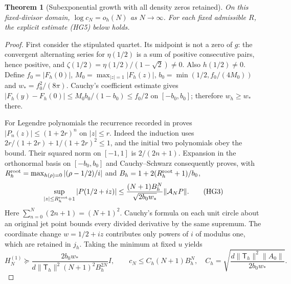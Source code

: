 \documentclass[11pt]{article}
\newtheorem{theorem}{Theorem}\newtheorem{lemma}[theorem]{Lemma}
\begin{document}
\begin{theorem}[Subexponential growth with all density zeros retained]
On this fixed-divisor domain, $\log c_N=o_h(N)$ as $N\to\infty$.
For each fixed admissible $R$, the explicit estimate (HG5) below holds.
\end{theorem}
\begin{proof}
First consider the stipulated quartet. Its midpoint is not a zero of
$g$: the convergent alternating series for $\eta(1/2)$ is a sum of
positive consecutive pairs, hence positive, and
$\zeta(1/2)=\eta(1/2)/(1-\sqrt2)\ne0$. Also $h(1/2)\ne0$.
Define $f_0=|F_h(0)|$, $M_0=\max_{|z|=1}|F_h(z)|$,
$b_0=\min(1/2,f_0/(4M_0))$ and $w_*=f_0^2/(8\pi)$.
Cauchy's coefficient estimate gives
$|F_h(y)-F_h(0)|\le M_0b_0/(1-b_0)\le f_0/2$ on $[-b_0,b_0]$;
therefore $w_h\ge w_*$ there.

For Legendre polynomials the recurrence recorded in
\cite[Table 18.9.1]{DLMF18} proves
$|P_n(z)|\le(1+2r)^n$ on $|z|\le r$. Indeed the induction uses
$2r/(1+2r)+1/(1+2r)^2\le1$, and the initial two polynomials obey
the bound. Their squared norm on $[-1,1]$ is $2/(2n+1)$.
Expansion in the orthonormal basis on $[-b_0,b_0]$ and
Cauchy--Schwarz consequently proves, with
$R_h^{\rm root}=\max_{h(\rho)=0}|(\rho-1/2)/i|$ and
$B_h=1+2(R_h^{\rm root}+1)/b_0$,
\[
 \sup_{|z|\le R_h^{\rm root}+1}|P(1/2+iz)|
 \le\frac{(N+1)B_h^N}{\sqrt{2b_0w_*}}\|\mathcal A_NP\|.
 \tag{HG3}
\]
Here $\sum_{n=0}^N(2n+1)=(N+1)^2$. Cauchy's formula on each
unit circle about an original jet point bounds every divided derivative
by the same supremum. The coordinate change $w=1/2+iz$ contributes
only powers of $i$ of modulus one, which are retained in $j_h$.
Taking the minimum at fixed $u$ yields
\[
 H_N^{(1)}\succeq
 \frac{2b_0w_*}{d\|\mathsf T_h\|^2(N+1)^2B_h^{2N}}I,
 \qquad c_N\le C_h(N+1)B_h^N,
 \quad C_h=\sqrt{\frac{d\|\mathsf T_h\|^2\|A_0\|}{2b_0w_*}}.
 \tag{HG4}
\]


\end{proof}
\end{document}
